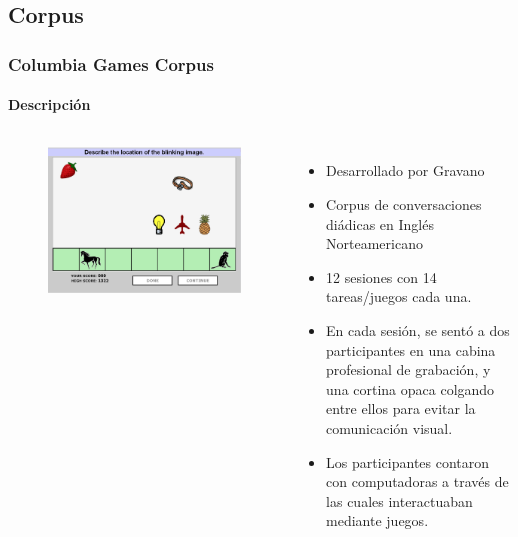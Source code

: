 \subsection{Corpus}
\begin{frame}
  \frametitle{Columbia Games Corpus}
  \framesubtitle{Descripción}
  \begin{columns}
      \begin{figure}
        \includegraphics[width=\textwidth]{images/columbia_games_color.jpg}
      \end{figure}


    \begin{itemize}
      \item Desarrollado por Gravano
      \item Corpus de conversaciones diádicas en Inglés Norteamericano
      \item 12 sesiones con 14 tareas/juegos cada una.
      \item En cada sesión, se sentó a dos participantes en una cabina profesional de grabación, y una cortina opaca colgando entre ellos para evitar la comunicación visual.
      \item Los participantes contaron con computadoras a través de las cuales interactuaban mediante juegos.
    \end{itemize}
  \end{columns}

\end{frame}


